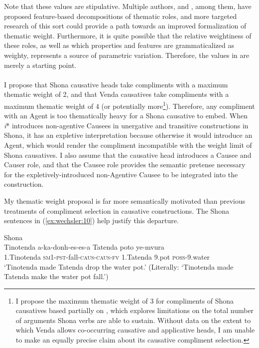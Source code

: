 \documentclass[output=paper,modfonts,nonflat,colorlinks,citecolor=brown]{langsci/langscibook}
\begin{document}
Note that these values are stipulative. Multiple authors, \citet{Wunderlich1997} and \citet{Mylne1999}, among them, have proposed feature-based decompositions of thematic roles, and more targeted research of this sort could provide a path towards an improved formalization of thematic weight. Furthermore, it is quite possible that the relative weightiness of these roles, as well as which properties and features are grammaticalized as weighty, represents a source of parametric variation. Therefore, the values in  are merely a starting point.\\
\\
I propose that Shona causative heads take compliments with a maximum thematic weight of 2, and that Venda causatives take compliments with a maximum thematic weight of 4 (or potentially more\footnote{I propose the maximum thematic weight of 3 for compliments of Shona causatives based partially on \citet{Wechsler2014}, which explores limitations on the total number of arguments Shona verbs are able to sustain. Without data on the extent to which Venda allows co-occurring causative and applicative heads, I am unable to make an equally precise claim about its causative compliment selection.}). Therefore, any compliment with an Agent is too thematically heavy for a Shona causative to embed. When \textit{i}* introduces non-agentive Causees in unergative and transitive constructions in Shona, it has an expletive interpretation because otherwise it would introduce an Agent, which would render the compliment incompatible with the weight limit of Shona causatives. I also assume that the causative head introduces a Causee and Causer role, and that the Causee role provides the semantic pretense necessary for the expletively-introduced non-Agentive Causee to be integrated into the construction. 



My thematic weight proposal is far more semantically motivated than previous treatments of compliment selection in causative constructions. The Shona sentences in (\ref{ex:wechsler:10}) help justify this departure.


\ea\label{ex:wechsler:10}
Shona\\ 
\ea\label{ex:wechsler:10a}
\gll Tinotenda {a-ka-donh-es-es-a}  {{Tatenda}}  {{poto}} {ye-mvura}\\
 1.Tinotenda  \textsc{sm}1-\textsc{pst}{}-fall-\textsc{caus}{}-\textsc{caus}{}-\textsc{fv}  {1.Tatenda}  {9.pot}  \textsc{poss}{}-9.water\\
\glt `Tinotenda made Tatenda drop the water pot.’
(Literally: ‘Tinotenda made Tatenda make the water pot fall.’)\\
\end{document}

